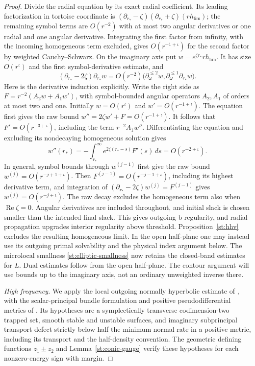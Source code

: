 \begin{proof}
Divide the radial equation by its exact radial coefficient.
Its leading factorization in tortoise coordinate is
$(\partial_{r_*}-\zeta)(\partial_{r_*}+\zeta)(rh_{\mathrm{lim}})$;
the remaining symbol terms are $O(r^{-2})$ with at most two
angular derivatives or one radial and one angular derivative.
Integrating the first factor from infinity, with the incoming
homogeneous term excluded, gives $O(r^{-1+\iota})$ for the
second factor by weighted Cauchy--Schwarz.  On the imaginary
axis put $w=e^{\zeta r_*}rh_{\mathrm{lim}}$.  It has size
$O(r^\iota)$ and the first symbol-derivative estimate, and
\begin{equation}\label{st:outgoing-symbol}
 (\partial_{r_*}-2\zeta)\partial_{r_*}w
 =O(r^{-2})\bigl(\partial_\omega^{\leq2}w,
                  \partial_\omega^{\leq1}\partial_{r_*}w\bigr).
\end{equation}
Here is the derivative induction explicitly.  Write the right
side as $F=r^{-2}(A_2w+A_1w')$, with symbol-bounded angular
operators $A_2,A_1$ of orders at most two and one.  Initially
$w=O(r^\iota)$ and $w'=O(r^{-1+\iota})$.  The equation first
gives the raw bound $w''=2\zeta w'+F=O(r^{-1+\iota})$.
It follows that $F'=O(r^{-3+\iota})$, including the term
$r^{-2}A_1w''$.  Differentiating the equation and excluding its
nondecaying homogeneous solution gives
\[
 w''(r_*)=-\int_{r_*}^{\infty}
       e^{2\zeta(r_*-s)}F'(s)\,ds=O(r^{-2+\iota}).
\]
In general, symbol bounds through $w^{(j-1)}$ first give the raw
bound $w^{(j)}=O(r^{-j+1+\iota})$.  Then
$F^{(j-1)}=O(r^{-j-1+\iota})$, including its highest derivative
term, and integration of
$(\partial_{r_*}-2\zeta)w^{(j)}=F^{(j-1)}$
gives $w^{(j)}=O(r^{-j+\iota})$.  The raw decay excludes the
homogeneous term also when $\operatorname{Re}\zeta=0$.
Angular derivatives are included throughout, and initial slack
is chosen smaller than the intended final slack.  This gives outgoing b-regularity,
and radial propagation upgrades interior regularity above threshold.
Proposition~\ref{st:hhv} excludes the resulting homogeneous limit.
In the open half-plane one may instead use its outgoing primal
solvability and the physical index argument below.
The microlocal smallness \eqref{st:elliptic-smallness} now retains
the closed-band estimates for $L$.  Dual estimates follow from
the open half-plane.  The contour argument will use bounds up
to the imaginary axis, not an ordinary unweighted inverse there.

\emph{High frequency.}
We apply the local outgoing normally hyperbolic estimate of
\cite[Theorem~1]{Dyatlov2016}, with the scalar-principal bundle
formulation and positive pseudodifferential metrics of
\cite[Condition~(2.5), Proposition~3.12]{Hintz2017}.  Its hypotheses are a symplectically
transverse codimension-two trapped set, smooth stable and unstable
surfaces, and imaginary subprincipal transport defect strictly
below half the minimum normal rate in a positive metric, including
its transport and the half-density convention.  The geometric
defining functions $z_1\pm z_2$ and Lemma~\ref{st:conic-gauge}
verify these hypotheses for each nonzero-energy sign with margin.


\end{proof}
